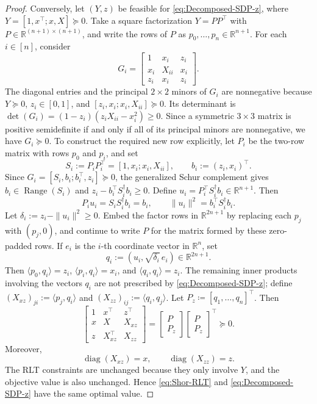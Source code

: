 \documentclass[11pt]{article}
\DeclareMathOperator{\diag}{diag}
\def\R{\mathbb{R}}
\def\Range{{\operatorname{Range}}}
\theoremstyle{plain}
\begin{document}
\begin{proof}
Conversely, let $(Y,z)$ be feasible for \eqref{eq:Decomposed-SDP-z}, where $Y=[1,x^\top;x,X]\succeq0$. Take a square factorization $Y=PP^\top$ with $P\in\R^{(n+1)\times(n+1)}$, and write the rows of $P$ as $p_0,\ldots,p_n\in\R^{n+1}$. For each $i\in[n]$, consider
\[
G_i=
\begin{bmatrix}
1&x_i&z_i\\
x_i&X_{ii}&x_i\\
z_i&x_i&z_i
\end{bmatrix}.
\]
The diagonal entries and the principal $2\times2$ minors of $G_i$ are nonnegative because $Y\succeq0$, $z_i\in[0,1]$, and $[z_i,x_i;x_i,X_{ii}]\succeq0$. Its determinant is $\det(G_i)=(1-z_i)(z_iX_{ii}-x_i^2)\ge0$. Since a symmetric $3\times3$ matrix is positive semidefinite if and only if all of its principal minors are nonnegative, we have $G_i\succeq0$.
To construct the required new row explicitly, let $P_i$ be the two-row matrix with rows $p_0$ and $p_i$, and set
\[
S_i:=P_iP_i^\top=[1,x_i;x_i,X_{ii}],
\qquad
b_i:=(z_i,x_i)^\top .
\]
Since $G_i=[S_i,b_i;b_i^\top,z_i]\succeq0$, the generalized Schur complement gives $b_i\in\Range(S_i)$ and $z_i-b_i^\top S_i^\dagger b_i\ge0$. Define $u_i=P_i^\top S_i^\dagger b_i\in\R^{n+1}$. Then
\[
P_i u_i=S_iS_i^\dagger b_i=b_i,
\qquad
\|u_i\|^2=b_i^\top S_i^\dagger b_i .
\]
Let $\delta_i:=z_i-\|u_i\|^2\ge0$. Embed the factor rows in $\R^{2n+1}$ by replacing each $p_j$ with $(p_j,0)$, and continue to write $P$ for the matrix formed by these zero-padded rows. If $e_i$ is the $i$-th coordinate vector in $\R^n$, set
\[
q_i:=(u_i,\sqrt{\delta_i}\,e_i)\in\R^{2n+1}.
\]
Then $\langle p_0,q_i\rangle=z_i$, $\langle p_i,q_i\rangle=x_i$, and $\langle q_i,q_i\rangle=z_i$. The remaining inner products involving the vectors $q_i$ are not prescribed by \eqref{eq:Decomposed-SDP-z}; define $(X_{xz})_{ji}:=\langle p_j,q_i\rangle$ and $(X_{zz})_{ij}:=\langle q_i,q_j\rangle$.
Let $P_z\coloneq[q_1,\ldots,q_n]^\top$. Then
\[
\begin{bmatrix}
1&x^\top&z^\top\\
x&X&X_{xz}\\
z&X_{xz}^\top&X_{zz}
\end{bmatrix}
=
\begin{bmatrix}
P\\
P_z
\end{bmatrix}
\begin{bmatrix}
P\\
P_z
\end{bmatrix}^{\top}
\succeq0.
\]
Moreover,
\[
\diag(X_{xz})=x,\qquad \diag(X_{zz})=z.
\]
The RLT constraints are unchanged because they only involve $Y$, and the objective value is also unchanged. Hence \eqref{eq:Shor-RLT} and \eqref{eq:Decomposed-SDP-z} have the same optimal value. 


\end{proof}
\end{document}
